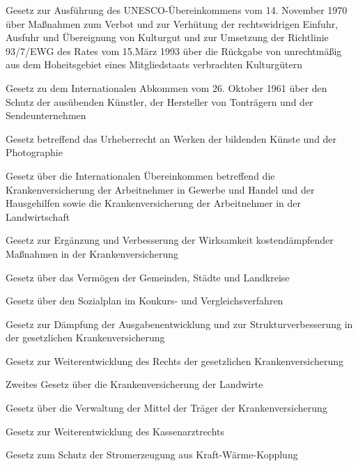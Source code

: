 \item[{KultGüRückG-2007}] Gesetz zur Ausführung des UNESCO-Übereinkommens vom 14. November 1970 über Maßnahmen zum Verbot und zur Verhütung der rechtswidrigen Einfuhr, Ausfuhr und Übereignung von Kulturgut und zur Umsetzung der Richtlinie 93/7/EWG des Rates vom 15.März 1993 über die Rückgabe von unrechtmäßig aus dem Hoheitsgebiet eines Mitgliedstaats verbrachten Kulturgütern

\item[{KunstSchAbkG}] Gesetz zu dem Internationalen Abkommen vom 26. Oktober 1961 über den Schutz der ausübenden Künstler, der Hersteller von Tonträgern und der Sendeunternehmen

\item[{KunstUrhG}] Gesetz betreffend das Urheberrecht an Werken der bildenden Künste und der Photographie

\item[{KVArbNÜbkG}] Gesetz über die Internationalen Übereinkommen betreffend die Krankenversicherung der Arbeitnehmer in Gewerbe und Handel und der Hausgehilfen sowie die Krankenversicherung der Arbeitnehmer in der Landwirtschaft

\item[{KVEG}] Gesetz zur Ergänzung und Verbesserung der Wirksamkeit kostendämpfender Maßnahmen in der Krankenversicherung

\item[{KVermG}] Gesetz über das Vermögen der Gemeinden, Städte und Landkreise

\item[{KVfSPlG}] Gesetz über den Sozialplan im Konkurs- und Vergleichsverfahren

\item[{KVKG}] Gesetz zur Dämpfung der Ausgabenentwicklung und zur Strukturverbesserung in der gesetzlichen Krankenversicherung

\item[{KVLG}] Gesetz zur Weiterentwicklung des Rechts der gesetzlichen Krankenversicherung

\item[{KVLG-1989}] Zweites Gesetz über die Krankenversicherung der Landwirte

\item[{KVMG}] Gesetz über die Verwaltung der Mittel der Träger der Krankenversicherung

\item[{KVWG}] Gesetz zur Weiterentwicklung des Kassenarztrechts

\item[{KWKG}] Gesetz zum Schutz der Stromerzeugung aus Kraft-Wärme-Kopplung

